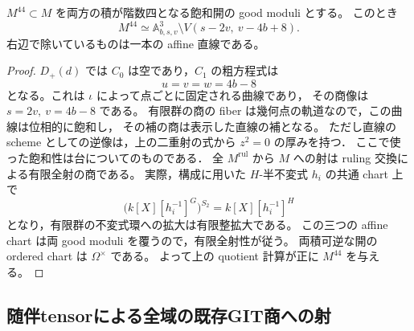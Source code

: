 \begin{corollary}[両積可逆なunordered良モジュライの明示開]
\label{cor:qa-both-invertible-good-moduli-affine-open}
$M^{44}\subset M$ を両方の積が階数四となる飽和開の good moduli とする。
このとき
\[
 M^{44}\simeq
 \mathbb A^3_{b,s,v}\setminus
 V(s-2v,\ v-4b+8).
 \tag{M44}\label{eq:qa-both-invertible-a3-minus-line}
\]
右辺で除いているものは一本の affine 直線である。
\end{corollary}
\begin{proof}
$D_+(d)$ では $C_0$ は空であり，$C_1$ の粗方程式は
\[
 u=v=w=4b-8
\]
となる。これは $\iota$ によって点ごとに固定される曲線であり，
その商像は $s=2v,\ v=4b-8$ である。
有限群の商の fiber は幾何点の軌道なので，この曲線は位相的に飽和し，
その補の商は表示した直線の補となる。
ただし直線の scheme としての逆像は，上の二重射の式から $z^2=0$ の厚みを持つ．
ここで使った飽和性は台についてのものである．
全 $M^{\mathrm{rul}}$ から $M$ への射は ruling 交換による有限全射の商である。
実際，構成に用いた $H$-半不変式 $h_i$ の共通 chart 上で
\[
 \bigl(k[X][h_i^{-1}]^G\bigr)^{S_2}
     =k[X][h_i^{-1}]^H
\]
となり，有限群の不変式環への拡大は有限整拡大である。
この三つの affine chart は両 good moduli を覆うので，有限全射性が従う。
両積可逆な開の ordered chart は $\Omega^\times$ である。
よって上の quotient 計算が正に $M^{44}$ を与える。
\end{proof}

\subsection{随伴tensorによる全域の既存GIT商への射}

